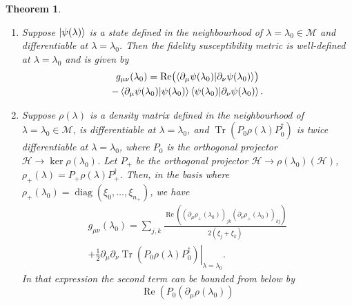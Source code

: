 \documentclass[american,aps,pra,reprint,floatfix,nofootinbib,superscriptaddress]{revtex4-2}
\DeclareMathOperator{\Tr}{Tr}
\DeclareMathOperator{\real}{Re}
\DeclareMathOperator{\diag}{diag}
\newtheorem{theorem}{Theorem}
\begin{document}
\begin{theorem}
  \label{th:def.g}
  \begin{enumerate}
    \item Suppose $\ket{\psi(\lambda)}$ is a state defined in the
      neighbourhood of
      $\lambda = \lambda_0 \in \mathcal{M}$ and differentiable at
      $\lambda=\lambda_0$.  Then the fidelity susceptibility metric
      is well-defined at
      $\lambda=\lambda_0$ and is given by
      \begin{multline}
        \label{eq:gmunu.pure}
        g_{\mu\nu}(\lambda_0) = \real\bigl(\braket{\partial_\mu \psi(\lambda_0)
          | \partial_\nu \psi(\lambda_0)}\bigr)\\
        - \braket{\partial_\mu \psi(\lambda_0) | \psi(\lambda_0)}
          \braket{\psi(\lambda_0) | \partial_\nu \psi(\lambda_0)}.
      \end{multline}
    \item Suppose $\rho(\lambda)$ is a density matrix defined in the
      neighbourhood of $\lambda = \lambda_0 \in \mathcal{M}$, 
      is differentiable at $\lambda = \lambda_0$, and $\Tr(P_0 \rho(\lambda) P_0^{\dagger})$
      is twice differentiable
      at $\lambda = \lambda_0$, where $P_0$ is the orthogonal
      projector $\mathcal{H} \to \ker\rho(\lambda_0)$.
      Let $P_{{+}}$ be the orthogonal projector
      $\mathcal{H} \to \rho(\lambda_0)(\mathcal{H})$,
      $\rho_{+}(\lambda) = P_{{+}} \rho(\lambda) P_{{+}}^{\dagger}$.
      Then, in the basis where
      $\rho_{+}(\lambda_0) = \diag(\xi_0,\dots,\xi_{n_{+}})$,
      we have
      \begin{multline}
        g_{\mu\nu}(\lambda_0)
        = \sum_{j,k} \frac{
            \real\left(
              (\partial_\mu\rho_{+}(\lambda_0))_{jk}
              (\partial_\nu\rho_{+}(\lambda_0))_{kj}
            \right)
          }{2(\xi_j + \xi_k)}\\
        + \frac12 \left.\partial_\mu \partial_\nu \Tr(P_0 \rho(\lambda) P_0^{\dagger})
          \right|_{\lambda=\lambda_0}.
      \end{multline}
      In that expression the second term can be bounded from below by
      \begin{equation}
        \label{eq:g2bound}
        \real\left(
          P_0 \left(\partial_\mu\rho(\lambda_0)\right)

\end{equation}
\end{enumerate}
\end{theorem}
\end{document}
